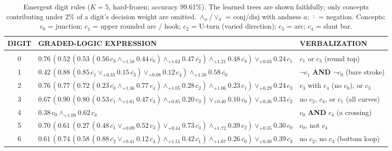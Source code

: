 \begin{table}[t]
\caption{Emergent digit rules ($K{=}5$, hard-frozen; accuracy 99.61\%). The learned trees are shown faithfully; only concepts contributing under 2\% of a digit's decision weight are omitted. $\wedge_a$/$\vee_a$ = conj/disj with andness $a$; $\overline{\cdot}$ = negation. Concepts: $c_{0}$ = junction; $c_{1}$ = upper rounded arc / hook; $c_{2}$ = U-turn (varied direction); $c_{3}$ = arc; $c_{4}$ = slant bar.}
\label{tab:digit-rules}
\begin{center}\footnotesize
\begin{tabular}{c l l}
{\bf DIGIT} & {\bf GRADED-LOGIC EXPRESSION} & {\bf VERBALIZATION} \\ \hline \\
0 & $0.76\,(0.52\,(0.53\,(0.56\,c_{3}\mathbin{\wedge}_{+1.58}0.44\,\overline{c_{0}})\mathbin{\wedge}_{+1.62}0.47\,\overline{c_{2}})\mathbin{\wedge}_{+1.21}0.48\,\overline{c_{4}})\mathbin{\vee}_{+0.03}0.24\,c_{1}$ & $c_1$ or $c_3$ (round top) \\[3pt]
1 & $0.42\,(0.88\,(0.85\,\overline{c_{1}}\mathbin{\vee}_{+0.33}0.15\,\overline{c_{3}})\mathbin{\vee}_{+0.08}0.12\,c_{4})\mathbin{\wedge}_{+1.38}0.58\,\overline{c_{0}}$ & $\neg c_1$ \textbf{AND} $\neg c_0$ (bare stroke) \\[3pt]
2 & $0.76\,(0.77\,(0.72\,(0.23\,\overline{c_{0}}\mathbin{\wedge}_{+1.36}0.77\,c_{4})\mathbin{\wedge}_{+1.05}0.28\,c_{2})\mathbin{\wedge}_{+1.06}0.23\,c_{1})\mathbin{\vee}_{+0.29}0.24\,c_{3}$ & $c_3$ with $c_4$ (no $c_0$), or $c_3$ \\[3pt]
3 & $0.67\,(0.90\,(0.80\,(0.53\,\overline{c_{1}}\mathbin{\wedge}_{+1.61}0.47\,\overline{c_{4}})\mathbin{\wedge}_{+0.85}0.20\,c_{3})\mathbin{\vee}_{+0.40}0.10\,\overline{c_{0}})\mathbin{\vee}_{+0.36}0.33\,\overline{c_{2}}$ & no $c_2$, $c_4$, or $c_1$ (all curves) \\[3pt]
4 & $0.38\,c_{0}\mathbin{\wedge}_{+1.08}0.62\,c_{4}$ & $c_0$ \textbf{AND} $c_4$ (a crossing) \\[3pt]
5 & $0.70\,(0.61\,(0.27\,(0.48\,\overline{c_{1}}\mathbin{\vee}_{+0.09}0.52\,c_{3})\mathbin{\vee}_{+0.44}0.73\,\overline{c_{4}})\mathbin{\wedge}_{+1.72}0.39\,c_{2})\mathbin{\vee}_{+0.35}0.30\,c_{0}$ & $c_0$, not $c_4$ \\[3pt]
6 & $0.61\,(0.74\,(0.58\,(0.88\,\overline{c_{2}}\mathbin{\vee}_{+0.41}0.12\,c_{4})\mathbin{\wedge}_{+1.51}0.42\,\overline{c_{1}})\mathbin{\wedge}_{+1.67}0.26\,\overline{c_{0}})\mathbin{\vee}_{+0.30}0.39\,\overline{c_{3}}$ & no $c_2$, no $c_3$ (bottom loop) \\[3pt]

\end{tabular}
\end{center}
\end{table}
